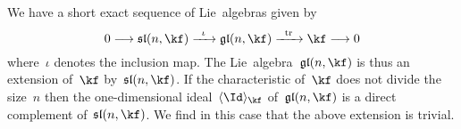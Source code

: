 \begin{example}
  We have a short exact sequence of Lie~algebras given by
  \[
    0
    \to
    \sllie(n, \kf)
    \xto{\iota}
    \gllie(n, \kf)
    \xto{\tr}
    \kf
    \to
    0
  \]
  where~$\iota$ denotes the inclusion map.
  The Lie~algebra~$\gllie(n, \kf)$ is thus an extension of~$\kf$ by~$\sllie(n, \kf)$.
  If the characteristic of~$\kf$ does not divide the size~$n$ then the one-dimensional ideal~$\gen{ \Id }_{\kf}$ of~$\gllie(n, \kf)$ is a direct complement of~$\sllie(n, \kf)$.
  We find in this case that the above extension is trivial.
\end{example}

